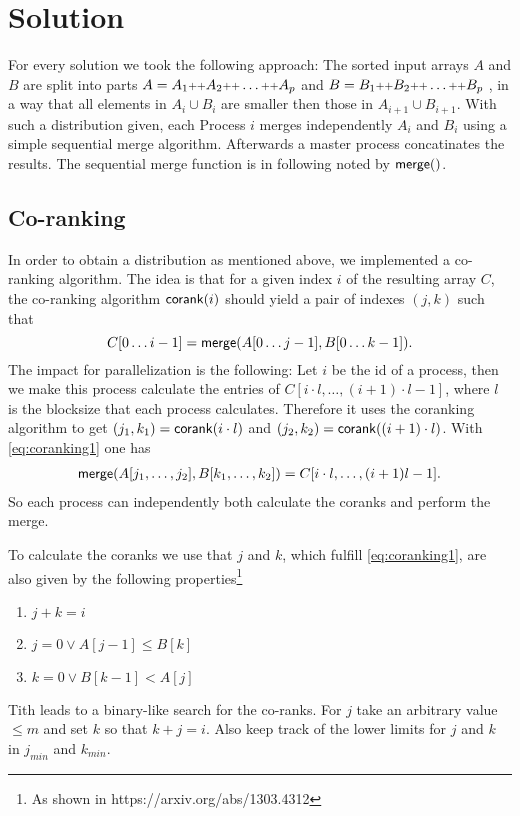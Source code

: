 \section{Solution}
For every solution we took the following approach:
The sorted input arrays $A$ and $B$ are split into parts
$A = A_1 \concat A_2 \concat \ldots \concat A_p$  and
$B = B_1 \concat B_2 \concat \ldots \concat B_p$
, in a way that all elements in $A_i \cup B_i$ are smaller then those in $A_{i+1} \cup B_{i+1}$. 
With such a distribution given, each Process $i$ merges independently $A_i$ and $B_i$ using a simple sequential merge algorithm.
Afterwards a master process concatinates the results.
The sequential merge function is in following noted by $\merge()$.

\subsection{Co-ranking}
In order to obtain a distribution as mentioned above, we implemented a co-ranking algorithm.
The idea is that for a given index $i$ of the resulting array $C$, 
the co-ranking algorithm $\corank(i)$ should yield a pair of indexes $(j,k)$
such that
\begin{equation}\label{eq:coranking1}
  C[0\ldots i-1] = \merge(A[0\ldots j-1],B[0\ldots k-1]).
\end{equation}
The impact for parallelization is the following:
Let $i$ be the id of a process,
then we make this process calculate the entries of $C[i \cdot l, \ldots, (i+1)\cdot l - 1]$,
where $l$ is the blocksize that each process calculates.
Therefore it uses the coranking algorithm to get
$(j_1,k_1) = \corank(i\cdot l)$ and $(j_2,k_2) = \corank((i+1)\cdot l)$.
With \eqref{eq:coranking1} one has
\begin{align*}
  \merge(A[j_1,\ldots,j_2],B[k_1,\ldots,k_2]) = C[i \cdot l,\ldots, (i+1)l - 1].
\end{align*}
So each process can independently both calculate the coranks and perform the merge.

To calculate the coranks we use that
$j$ and $k$, which fulfill \eqref{eq:coranking1}, are also given by the following
properties\footnote{As shown in https://arxiv.org/abs/1303.4312}
\begin{enumerate}
  \item $j + k = i$
  \item $j = 0 \vee A[j-1] \leq B[k]$\label{first_inequal}
  \item $k = 0 \vee B[k-1] < A[j]$
\end{enumerate}
Tith leads to a binary-like search for the co-ranks.
For $j$ take an arbitrary value $\leq m$ and set $k$ so that $k + j = i$.
Also keep track of the lower limits for $j$ and $k$ in $j_{min}$ and $k_{min}$.

